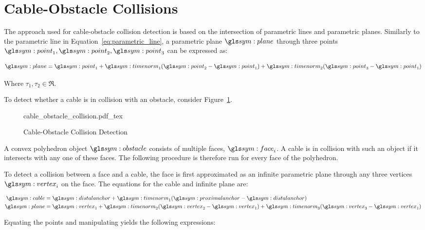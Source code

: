 \section{Cable-Obstacle Collisions}%
\label{sec:cable_obstacle_collisions}

	The approach used for cable-obstacle collision detection is based on the
	intersection of parametric lines and parametric planes. Similarly to the
	parametric line in Equation~\ref{eq:parametric_line}, a parametric plane
	$\plane$ through three points $\point_1, \point_2, \point_3$ can be
	expressed as:

	\begin{equation}
		\plane = \point_1 + \timenorm_1(\point_2 - \point_1) +
		\timenorm_2(\point_3 - \point_1)
	\end{equation}

	Where $\tau_1, \tau_2 \in \Re$.

	To detect whether a cable is in collision with an obstacle, consider
	Figure~\ref{fig:cable_obstacle_collision_detection}.

	\begin{figure}[hbt]
		\centering
		\def\svgwidth{\columnwidth}
		{cable_obstacle_collision.pdf_tex}
		\caption{Cable-Obstacle Collision Detection}%
		\label{fig:cable_obstacle_collision_detection}
	\end{figure}

	A convex polyhedron object $\obstacle$ consists of multiple faces,
	${\face}_i$. A cable is in collision with such an object if it intersects
	with any one of these faces.  The following procedure is therefore run for
	every face of the polyhedron.

	To detect a collision between a face and a cable, the face is first
	approximated as an infinite parametric plane through any three vertices
	$\vertex_i$ on the face. The equations for the cable and infinite plane are:

	\begin{align}
		\cable &= \distalanchor + \timenorm_1(\proximalanchor - \distalanchor)\\
		\plane &= \vertex_1 + \timenorm_2(\vertex_2 - \vertex_1) +
		\timenorm_3(\vertex_3 - \vertex_1)
	\end{align}

	Equating the points and manipulating yields the following expressions:

